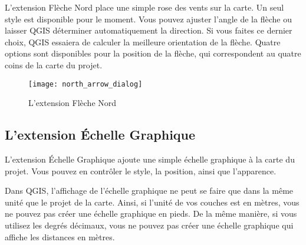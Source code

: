 L'extension Flèche Nord place une simple rose des vents sur la carte. Un seul
style est disponible pour le moment. Vous pouvez ajuster l'angle de la flèche 
ou laisser QGIS déterminer automatiquement la direction. Si vous faites ce 
dernier choix, QGIS essaiera de calculer la meilleure orientation de la flèche.
Quatre options sont disponibles pour la position de la flèche, qui correspondent
au quatre coins de la carte du projet.

\begin{figure}[ht]
   \begin{center}
   \texttt{[image: north\_arrow\_dialog]} 
   \caption{L'extension Flèche Nord \nixcaption}\label{fig:north_arrow}
\end{center}  
\end{figure}

\subsection{L'extension Échelle Graphique}\label{scalebar}

L'extension Échelle Graphique ajoute une simple échelle graphique à la carte du
projet.
Vous pouvez en contrôler le style, la position, ainsi que l'apparence.

Dans QGIS, l'affichage de l'échelle graphique ne peut se faire que dans la même 
unité que le projet de la carte. Ainsi, si l'unité de vos couches est en mètres, 
vous ne pouvez pas créer une échelle graphique en pieds. De la même manière, si 
vous utilisez les degrés décimaux, vous ne pouvez pas créer une échelle 
graphique qui affiche les distances en mètres.

